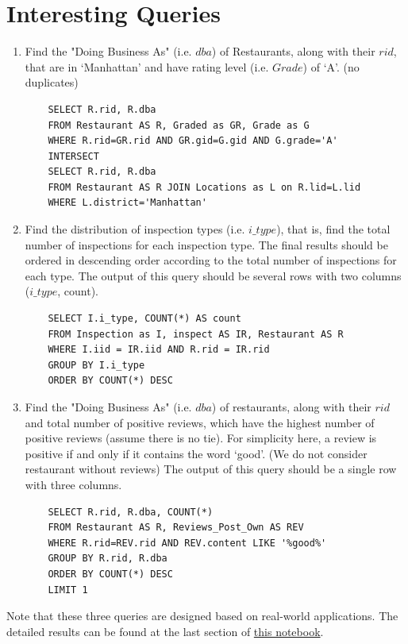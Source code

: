\documentclass[a4paper,12pt]{article}
\theoremstyle{definition}
\begin{document}
\section{Interesting Queries}
\begin{enumerate}
    \item Find the "Doing Business As" (i.e. $dba$) of Restaurants, along with their $rid$, that are in `Manhattan' and have rating level (i.e. $Grade$) of `A'. (no duplicates)
    \begin{verbatim}
    SELECT R.rid, R.dba
    FROM Restaurant AS R, Graded as GR, Grade as G
    WHERE R.rid=GR.rid AND GR.gid=G.gid AND G.grade='A'
    INTERSECT
    SELECT R.rid, R.dba
    FROM Restaurant AS R JOIN Locations as L on R.lid=L.lid
    WHERE L.district='Manhattan'
\end{verbatim}
\item Find the distribution of inspection types (i.e. $i\_type$), that is, find the total number of inspections for each inspection type. The final results should be ordered in descending order according to the total number of inspections for each type. The output of this query should be several rows with two columns ($i\_type$, count).
    \begin{verbatim}
    SELECT I.i_type, COUNT(*) AS count
    FROM Inspection as I, inspect AS IR, Restaurant AS R
    WHERE I.iid = IR.iid AND R.rid = IR.rid
    GROUP BY I.i_type
    ORDER BY COUNT(*) DESC
\end{verbatim}
\item Find the "Doing Business As" (i.e. $dba$) of restaurants, along with their $rid$ and total number of positive reviews, which have the highest number of positive reviews (assume there is no tie). For simplicity here, a review is positive if and only if it contains the word `good'. (We do not consider restaurant without reviews) The output of this query should be a single row with three columns.
    \begin{verbatim}
    SELECT R.rid, R.dba, COUNT(*)
    FROM Restaurant AS R, Reviews_Post_Own AS REV
    WHERE R.rid=REV.rid AND REV.content LIKE '%good%'
    GROUP BY R.rid, R.dba
    ORDER BY COUNT(*) DESC
    LIMIT 1
\end{verbatim}
\end{enumerate}
Note that these three queries are designed based on real-world applications. The detailed results can be found at the last section of  \href{https://github.com/Xiaoyang-Song/NYC-Restaurant-Inspection-Database/blob/main/4111p1.ipynb}{this notebook}. 
\end{document}
